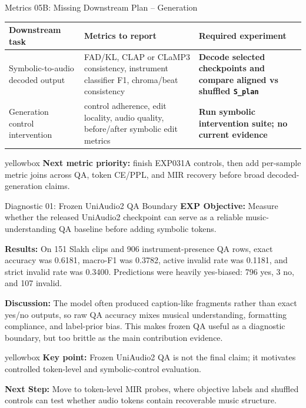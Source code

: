 \documentclass[aspectratio=169,11pt]{beamer}
\newcommand{\missing}[1]{{\color{missingred}\textbf{#1}}}
\newcommand{\code}[1]{\texttt{\footnotesize #1}}
\newcommand{\expfield}[2]{\textbf{#1:} #2\par\vspace{0.10cm}}
\newenvironment{keybox}{%
  \begin{beamercolorbox}[rounded=true,sep=0.14cm,wd=\linewidth]{yellowbox}\footnotesize%
}{%
  \end{beamercolorbox}%
}
\begin{document}
\begin{frame}{Metrics 05B: Missing Downstream Plan -- Generation}
  \footnotesize
  \begin{tabularx}{\linewidth}{p{2.5cm}Yp{3.7cm}}
    \toprule
    Downstream task & Metrics to report & Required experiment \\
    \midrule
    Symbolic-to-audio decoded output & FAD/KL, CLAP or CLaMP3 consistency, instrument classifier F1, chroma/beat consistency & \missing{Decode selected checkpoints and compare aligned vs shuffled \code{S\_plan}} \\
    Generation control intervention & control adherence, edit locality, audio quality, before/after symbolic edit metrics & \missing{Run symbolic intervention suite; no current evidence} \\
    \bottomrule
  \end{tabularx}

  \vspace{0.2cm}
  \begin{keybox}\textbf{Next metric priority:} finish EXP031A controls, then add per-sample metric joins across QA, token CE/PPL, and MIR recovery before broad decoded-generation claims.\end{keybox}
\end{frame}

\begin{frame}{Diagnostic 01: Frozen UniAudio2 QA Boundary}
  \footnotesize
  \expfield{EXP Objective}{Measure whether the released UniAudio2 checkpoint can serve as a reliable music-understanding QA baseline before adding symbolic tokens.}
  \expfield{Results}{On 151 Slakh clips and 906 instrument-presence QA rows, exact accuracy was 0.6181, macro-F1 was 0.3782, active invalid rate was 0.1181, and strict invalid rate was 0.3400. Predictions were heavily yes-biased: 796 yes, 3 no, and 107 invalid.}
  \expfield{Discussion}{The model often produced caption-like fragments rather than exact yes/no outputs, so raw QA accuracy mixes musical understanding, formatting compliance, and label-prior bias. This makes frozen QA useful as a diagnostic boundary, but too brittle as the main contribution evidence.}
  \begin{keybox}\textbf{Key point:} Frozen UniAudio2 QA is not the final claim; it motivates controlled token-level and symbolic-control evaluation.\end{keybox}
  \vspace{0.18cm}
  \expfield{Next Step}{Move to token-level MIR probes, where objective labels and shuffled controls can test whether audio tokens contain recoverable music structure.}
\end{frame}
\end{document}
